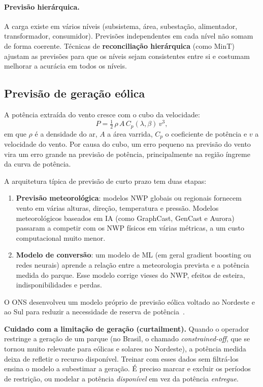\documentclass[11pt,a4paper]{article}
\begin{document}
\paragraph{Previsão hierárquica.} A carga existe em vários níveis
(subsistema, área, subestação, alimentador, transformador, consumidor).
Previsões independentes em cada nível não somam de forma coerente. Técnicas de
\textbf{reconciliação hierárquica} (como MinT) ajustam as previsões para que
os níveis sejam consistentes entre si e costumam melhorar a acurácia em todos
os níveis.

\subsection{Previsão de geração eólica}

A potência extraída do vento cresce com o cubo da velocidade:
\begin{equation}
  P = \tfrac{1}{2}\,\rho\, A\, C_p(\lambda, \beta)\, v^3,
\end{equation}
em que $\rho$ é a densidade do ar, $A$ a área varrida, $C_p$ o coeficiente de
potência e $v$ a velocidade do vento. Por causa do cubo, um erro pequeno na
previsão do vento vira um erro grande na previsão de potência, principalmente
na região íngreme da curva de potência.

A arquitetura típica de previsão de curto prazo tem duas etapas:
\begin{enumerate}
  \item \textbf{Previsão meteorológica}: modelos NWP globais ou regionais
    fornecem vento em várias alturas, direção, temperatura e pressão.
    Modelos meteorológicos baseados em IA (como GraphCast, GenCast e Aurora)
    passaram a competir com os NWP físicos em várias métricas, a um custo
    computacional muito menor.
  \item \textbf{Modelo de conversão}: um modelo de ML (em geral gradient
    boosting ou redes neurais) aprende a relação entre a meteorologia
    prevista e a potência medida do parque. Esse modelo corrige vieses do
    NWP, efeitos de esteira, indisponibilidades e perdas.
\end{enumerate}

O ONS desenvolveu um modelo próprio de previsão eólica voltado ao Nordeste e
ao Sul para reduzir a necessidade de reserva de potência~\cite{onseolico}.

\begin{nota}
\textbf{Cuidado com a limitação de geração (curtailment).} Quando o operador
restringe a geração de um parque (no Brasil, o chamado
\textit{constrained-off}, que se tornou muito relevante para eólicas e solares
no Nordeste), a potência medida deixa de refletir o recurso disponível. Treinar
com esses dados sem filtrá-los ensina o modelo a subestimar a geração. É
preciso marcar e excluir os períodos de restrição, ou modelar a potência
\emph{disponível} em vez da potência \emph{entregue}.
\end{nota}
\end{document}
